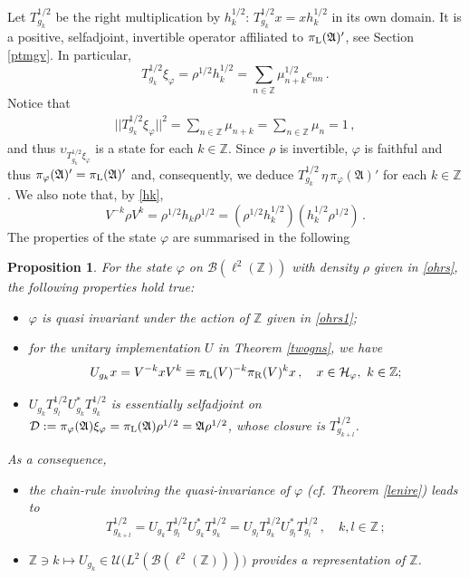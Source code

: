 \documentclass[12pt]{amsart}
\numberwithin{equation}{section}
\def\cb{{\mathcal B}}
\def\cd{{\mathcal D}}
\def\cu{{\mathcal U}}
\def\ga{{\mathfrak A}} \def\gpa{{\mathfrak a}}
\def\bz{{\mathbb Z}}
\def\r{\rho}\def\R{\mathop{\rm P}}
\def\f{\varphi}\def\ff{\phi} \def\F{\Phi}
\newtheorem{prop}[thm]{Proposition}
\begin{document}
Let $T^{1/2}_{g_k}$ be the right multiplication by $h_k^{1/2}$:
$T^{1/2}_{g_k}x=xh_k^{1/2}$ in its own domain. It is a positive, selfadjoint, invertible operator affiliated to $\pi_{\rm L}(\ga)'$, see Section \ref{ptmgv}. In particular,
\begin{equation}
\label{norm1}
T^{1/2}_{g_k}\xi_\f=\rho^{1/2}h_k^{1/2}=																\sum_{n\in\mathbb Z}\mu_{n+k}^{1/2}e_{nn}\,.
\end{equation}
Notice that
\begin{eqnarray*}
||T^{1/2}_{g_k}\xi_\f||^2=\sum_{n\in\mathbb Z}\mu_{n+k}=\sum_{n\in\mathbb Z}\mu_{n}=1\,,
\end{eqnarray*}
and thus $\upsilon_{T^{1/2}_{g_k}\xi_\f}$ is a state for each $k\in\bz$. Since $\r$ is invertible, $\f$ is faithful and thus
$\pi_\f(\ga)'=\pi_{\rm L}(\ga)'$ and, consequently, we deduce $T^{1/2}_{g_k}\,\eta\,\pi_\f(\ga)'$ for each $k\in\bz$.
We also note that, by \eqref{hk},
\begin{equation}
\label{rhok}
V^{-k}\rho V^k=\rho^{1/2}h_k\rho^{1/2}=(\rho^{1/2}h_k^{1/2})(h_k^{1/2}\rho^{1/2})\,.
\end{equation}
The properties of the state $\f$ are summarised in the following
\begin{prop}
For the state $\f$ on $\cb(\ell^2(\bz))$ with density $\r$ given in \eqref{ohrs}, the following properties hold true:
\begin{itemize}
\item[(i)] $\f$ is quasi invariant under the action of $\bz$ given in \eqref{ohrs1};
\item[(ii)] for the unitary implementation $U$ in Theorem \ref{twogns}, we have
\begin{eqnarray*}
U_{g_k}x=V^{-k}xV^k\equiv\pi_{\rm L}(V)^{-k}\pi_{\rm R}(V)^{k}x\,,\quad x\in\mathcal H_\f,\,\,k\in\mathbb Z;
\end{eqnarray*}
\item[(iii)] $U_{g_k}T_{g_l}^{1/2}U_{g_k}^*T_{g_k}^{1/2}$ is essentially selfadjoint on 
$\cd:=\pi_\f(\ga)\xi_\f=\pi_{\rm L}(\ga)\r^{1/2}=\ga\r^{1/2}$, whose closure is $T_{g_{k+l}}^{1/2}$.
\end{itemize}
As a consequence, 
\begin{itemize}
\item[(1)] the chain-rule involving the quasi-invariance of $\f$ (cf. Theorem \ref{lenire}) leads to
$$
T_{g_{k+l}}^{1/2}=U_{g_k}T_{g_l}^{1/2}U_{g_k}^*T_{g_k}^{1/2}
=U_{g_l}T_{g_k}^{1/2}U_{g_l}^*T_{g_l}^{1/2}\,,\quad k,l\in\bz\,;
$$
\item[(2)] $\bz\ni k\mapsto U_{g_k}\in\cu\big(L^2(\cb(\ell^2(\bz)))\big)$ provides a representation of $\bz$.
\end{itemize}
\end{prop}
\end{document}
